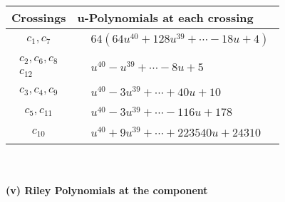 \documentclass[1p]{elsarticle_modified}
\theoremstyle{definition}
\begin{document}
\begin{tabular}{m{50pt}|m{274pt}}
Crossings & \hspace{64pt}u-Polynomials at each crossing \\
\hline $$\begin{aligned}c_{1},c_{7}\end{aligned}$$&$\begin{aligned}
&64(64 u^{40}+128 u^{39}+\cdots-18 u+4)
\end{aligned}$\\
\hline $$\begin{aligned}c_{2},c_{6},c_{8}\\c_{12}\end{aligned}$$&$\begin{aligned}
&u^{40}- u^{39}+\cdots-8 u+5
\end{aligned}$\\
\hline $$\begin{aligned}c_{3},c_{4},c_{9}\end{aligned}$$&$\begin{aligned}
&u^{40}-3 u^{39}+\cdots+40 u+10
\end{aligned}$\\
\hline $$\begin{aligned}c_{5},c_{11}\end{aligned}$$&$\begin{aligned}
&u^{40}-3 u^{39}+\cdots-116 u+178
\end{aligned}$\\
\hline $$\begin{aligned}c_{10}\end{aligned}$$&$\begin{aligned}
&u^{40}+9 u^{39}+\cdots+223540 u+24310
\end{aligned}$\\
\hline
\end{tabular}\\~\\
\newpage\renewcommand{\arraystretch}{1}
\flushleft \textbf{(v) Riley Polynomials at the component}\newline \\
\end{document}
